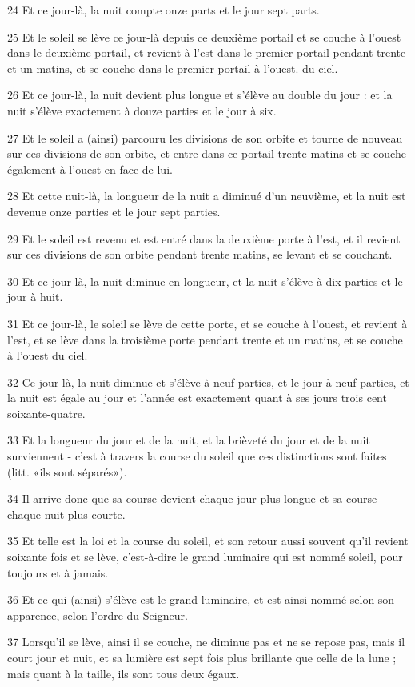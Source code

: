 \par 24 Et ce jour-là, la nuit compte onze parts et le jour sept parts.
\par 25 Et le soleil se lève ce jour-là depuis ce deuxième portail et se couche à l'ouest dans le deuxième portail, et revient à l'est dans le premier portail pendant trente et un matins, et se couche dans le premier portail à l'ouest. du ciel.
\par 26 Et ce jour-là, la nuit devient plus longue et s'élève au double du jour : et la nuit s'élève exactement à douze parties et le jour à six.
\par 27 Et le soleil a (ainsi) parcouru les divisions de son orbite et tourne de nouveau sur ces divisions de son orbite, et entre dans ce portail trente matins et se couche également à l'ouest en face de lui.
\par 28 Et cette nuit-là, la longueur de la nuit a diminué d'un neuvième, et la nuit est devenue onze parties et le jour sept parties.
\par 29 Et le soleil est revenu et est entré dans la deuxième porte à l'est, et il revient sur ces divisions de son orbite pendant trente matins, se levant et se couchant.
\par 30 Et ce jour-là, la nuit diminue en longueur, et la nuit s'élève à dix parties et le jour à huit.
\par 31 Et ce jour-là, le soleil se lève de cette porte, et se couche à l'ouest, et revient à l'est, et se lève dans la troisième porte pendant trente et un matins, et se couche à l'ouest du ciel.
\par 32 Ce jour-là, la nuit diminue et s'élève à neuf parties, et le jour à neuf parties, et la nuit est égale au jour et l'année est exactement quant à ses jours trois cent soixante-quatre.
\par 33 Et la longueur du jour et de la nuit, et la brièveté du jour et de la nuit surviennent - c'est à travers la course du soleil que ces distinctions sont faites (litt. «ils sont séparés»).
\par 34 Il arrive donc que sa course devient chaque jour plus longue et sa course chaque nuit plus courte.
\par 35 Et telle est la loi et la course du soleil, et son retour aussi souvent qu'il revient soixante fois et se lève, c'est-à-dire le grand luminaire qui est nommé soleil, pour toujours et à jamais.
\par 36 Et ce qui (ainsi) s'élève est le grand luminaire, et est ainsi nommé selon son apparence, selon l'ordre du Seigneur.
\par 37 Lorsqu'il se lève, ainsi il se couche, ne diminue pas et ne se repose pas, mais il court jour et nuit, et sa lumière est sept fois plus brillante que celle de la lune ; mais quant à la taille, ils sont tous deux égaux.

